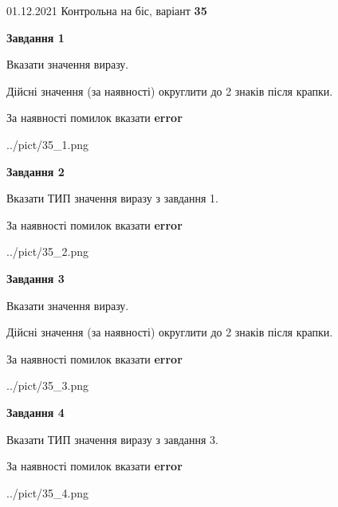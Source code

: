 \documentclass[11pt, ukrainian]{article}
\begin{document}
{01.12.2021 Контрольна на біс, варіант  \No \textbf { 35 }\par}
{
\begin {large}
{\begin {center}\textbf{Завдання 1}\end {center}}\par
Вказати значення виразу. \par
Дійсні значення (за наявності) округлити до 2 знаків після крапки. \par
За наявності помилок вказати \textbf{error}

\begin{center}
	{../pict/35_1.png}
\end{center}
\newpage

{\begin {center}\textbf{Завдання 2}\end {center}}\par
Вказати ТИП значення виразу з завдання 1. \par
За наявності помилок вказати \textbf{error}

\begin{center}
	{../pict/35_2.png}
\end{center}
\newpage

{\begin {center}\textbf{Завдання 3}\end {center}}\par
Вказати значення виразу. \par
Дійсні значення (за наявності) округлити до 2 знаків після крапки. \par
За наявності помилок вказати \textbf{error}

\begin{center}
	{../pict/35_3.png}
\end{center}
\newpage

{\begin {center}\textbf{Завдання 4}\end {center}}\par
Вказати ТИП значення виразу з завдання 3. \par
За наявності помилок вказати \textbf{error}

\begin{center}
	{../pict/35_4.png}
\end{center}
\newpage


\end{large}}
\end{document}
